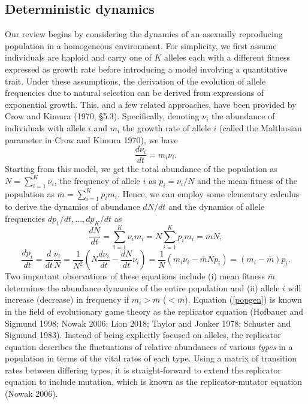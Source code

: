 \documentclass[]{article}
\begin{document}
\hypertarget{deterministic-dynamics}{%
\subsection{\texorpdfstring{Deterministic dynamics
\label{deterministic}}{Deterministic dynamics }}\label{deterministic-dynamics}}

Our review begins by considering the dynamics of an asexually
reproducing population in a homogeneous environment. For simplicity, we
first assume individuals are haploid and carry one of \(K\) alleles each
with a different fitness expressed as growth rate before introducing a
model involving a quantitative trait. Under these assumptions, the
derivation of the evolution of allele frequencies due to natural
selection can be derived from expressions of exponential growth. This,
and a few related approaches, have been provided by Crow and Kimura
(1970, \S 5.3). Specifically, denoting \(\nu_i\) the abundance of
individuals with allele \(i\) and \(m_i\) the growth rate of allele
\(i\) (called the Malthusian parameter in Crow and Kimura 1970), we have
\begin{equation}\label{first}
\frac{d\nu_i}{dt}=m_i\nu_i.
\end{equation} Starting from this model, we get the total abundance of
the population as \(N=\sum_{i=1}^K\nu_i\), the frequency of allele \(i\)
as \(p_i=\nu_i/N\) and the mean fitness of the population as
\(\bar m=\sum_{i=1}^Kp_im_i\). Hence, we can employ some elementary
calculus to derive the dynamics of abundance \(dN/dt\) and the dynamics
of allele frequencies \(dp_1/dt,\dots,dp_K/dt\) as \begin{equation}
\frac{dN}{dt}=\sum_{i=1}^K\nu_im_i=N\sum_{i=1}^Kp_im_i=\bar mN,
\end{equation} \begin{equation}\label{popgen}
\frac{dp_i}{dt}=\frac{d}{dt}\frac{\nu_i}{N}=\frac{1}{N^2}\left(N\frac{d\nu_i}{dt}-\frac{dN}{dt}\nu_i\right)
=\frac{1}{N}\left(m_i\nu_i-\bar m Np_i\right)=(m_i-\bar m)p_i.
\end{equation} Two important observations of these equations include (i)
mean fitness \(\bar m\) determines the abundance dynamics of the entire
population and (ii) allele \(i\) will increase (decrease) in frequency
if \(m_i>\bar m\) (\(<\bar m\)). Equation (\ref{popgen}) is known in the
field of evolutionary game theory as the replicator equation (Hofbauer
and Sigmund 1998; Nowak 2006; Lion 2018; Taylor and Jonker 1978;
Schuster and Sigmund 1983). Instead of being explicitly focused on
alleles, the replicator equation describes the fluctuations of relative
abundances of various \emph{types} in a population in terms of the vital
rates of each type. Using a matrix of transition rates between differing
types, it is straight-forward to extend the replicator equation to
include mutation, which is known as the replicator-mutator equation
(Nowak 2006).
\end{document}
